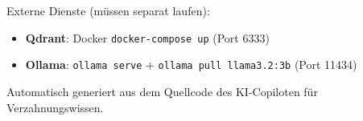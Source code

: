 \documentclass[12pt, a4paper]{article}
\begin{document}
Externe Dienste (müssen separat laufen):
\begin{itemize}
  \item \textbf{Qdrant}: Docker \texttt{docker-compose up} (Port 6333)
  \item \textbf{Ollama}: \texttt{ollama serve} + \texttt{ollama pull llama3.2:3b} (Port 11434)
\end{itemize}

\vfill
\begin{center}
  \small\color{accentgray}
  Automatisch generiert aus dem Quellcode des KI-Copiloten für Verzahnungswissen.
\end{center}
\end{document}
